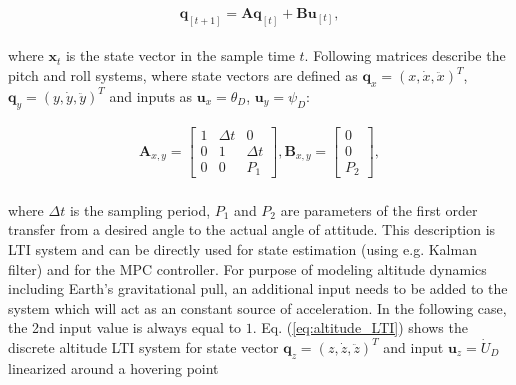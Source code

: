 \begin{equation}
\mathbf{q}_{[t+1]} = \mathbf{A}\mathbf{q}_{[t]}+ \mathbf{B}\mathbf{u}_{[t]},
\label{eq:lti_state_space}
\end{equation}
\\
where $\mathbf{x}_{t}$ is the state vector in the sample time $t$. Following matrices describe the pitch and roll systems, where state vectors are defined as $\mathbf{q}_{x} = \left(x, \dot{x}, \ddot{x}\right)^T$, $\mathbf{q}_{y} = \left(y, \dot{y}, \ddot{y}\right)^T$ and inputs as $\mathbf{u}_x = \theta_D$, $\mathbf{u}_y = \psi_D$:

\begin{equation}
\begin{split}
\mathbf{A}_{x, y} = \begin{bmatrix}
1 & \Delta t & 0 \\
0 & 1 & \Delta t \\
0 & 0 & P_1
\end{bmatrix}, \mathbf{B}_{x, y} = \begin{bmatrix}
0\\
0\\
P_2
\end{bmatrix},
\end{split}
\label{eq:attitude_LTI}
\end{equation}
\\
where $\Delta t$ is the sampling period, $P_1$ and $P_2$ are parameters of the first order transfer from a desired angle to the actual angle of attitude. This description is LTI system and can be directly used for state estimation (using e.g. Kalman filter) and for the MPC controller. For purpose of modeling altitude dynamics including Earth's gravitational pull, an additional input needs to be added to the system which will act as an constant source of acceleration. In the following case, the 2nd input value is always equal to $1$. Eq. (\ref{eq:altitude_LTI}) shows the discrete altitude LTI system for state vector $\mathbf{q}_{z} = \left(z, \dot{z}, \ddot{z}\right)^T$ and input $\mathbf{u}_z = \dot{U}_D$ linearized around a hovering point

